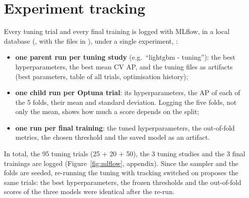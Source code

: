 \section{Experiment tracking}
\label{sec:tracking}

Every tuning trial and every final training is logged with MLflow, in a local
database (, with the files in ), under a single
experiment, :
\begin{itemize}
  \item \textbf{one parent run per tuning study} (e.g.\ ``lightgbm - tuning''):
  the best hyperparameters, the best mean CV AP, and the tuning files as
  artifacts (best parameters, table of all trials, optimisation history);
  \item \textbf{one child run per Optuna trial}: its hyperparameters, the AP of
  each of the 5 folds, their mean and standard deviation. Logging the five
  folds, not only the mean, shows how much a score depends on the split;
  \item \textbf{one run per final training}: the tuned hyperparameters, the
  out-of-fold metrics, the chosen threshold and the saved model as an artifact.
\end{itemize}
In total, the 95 tuning trials (25 + 20 + 50), the 3 tuning studies and the 3
final trainings are logged (Figure~\ref{fig:mlflow}, appendix). Since the
sampler and the folds are seeded, re-running the tuning with tracking switched
on proposes the same trials: the best hyperparameters, the frozen thresholds
and the out-of-fold scores of the three models were identical after the re-run.
